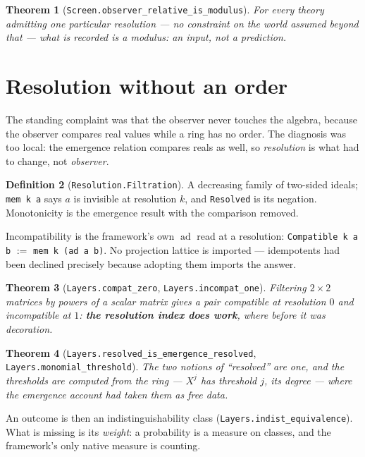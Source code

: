 \documentclass[11pt,a4paper]{article}
\newtheorem{theorem}{Theorem}[section]
\theoremstyle{definition}
\newtheorem{definition}[theorem]{Definition}
\theoremstyle{remark}
\newcommand{\lean}[1]{\texttt{\small #1}}
\begin{document}
\begin{theorem}[\lean{Screen.observer\_relative\_is\_modulus}]
For \emph{every} theory admitting one particular resolution --- no constraint on
the world assumed beyond that --- what is \emph{recorded} is a modulus: an input,
not a prediction.
\end{theorem}

\section{Resolution without an order}
\label{sec:resolution}

The standing complaint was that the observer never touches the algebra, because
the observer compares real values while a ring has no order. The diagnosis was too
local: the emergence relation compares reals as well, so \emph{resolution} is what
had to change, not \emph{observer}.

\begin{definition}[\lean{Resolution.Filtration}]
A decreasing family of two-sided ideals; \lean{mem k a} says $a$ is invisible at
resolution $k$, and \lean{Resolved} is its negation. Monotonicity is the emergence
result with the comparison removed.
\end{definition}

\begin{claimbox}
Incompatibility is the framework's own $\operatorname{ad}$ read at a resolution:
\lean{Compatible k a b} $:=$ \lean{mem k (ad a b)}. No projection lattice is
imported --- idempotents had been declined precisely because adopting them imports
the answer.
\end{claimbox}

\begin{theorem}[\lean{Layers.compat\_zero}, \lean{Layers.incompat\_one}]
Filtering $2\times2$ matrices by powers of a scalar matrix gives a pair compatible
at resolution $0$ and incompatible at $1$: \textbf{the resolution index does
work}, where before it was decoration.
\end{theorem}

\begin{theorem}[\lean{Layers.resolved\_is\_emergence\_resolved},
\lean{Layers.monomial\_threshold}]
The two notions of ``resolved'' are one, and the thresholds are \emph{computed
from the ring} --- $X^{j}$ has threshold $j$, its degree --- where the emergence
account had taken them as free data.
\end{theorem}

An outcome is then an indistinguishability class
(\lean{Layers.indist\_equivalence}). What is missing is its \emph{weight}: a
probability is a measure on classes, and the framework's only native measure is
counting.
\end{document}
